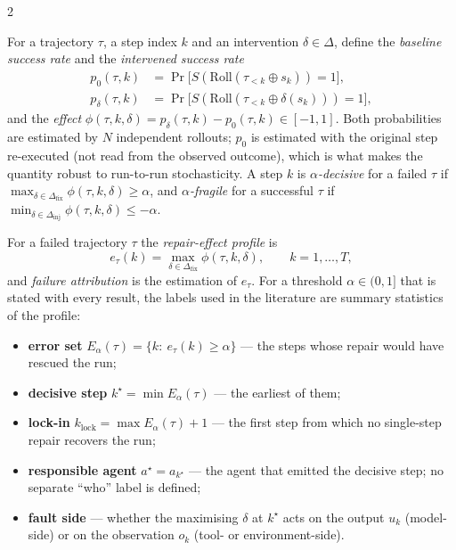 \begin{multicols}{2}
\begin{definition}\label{def:effect}
For a trajectory $\tau$, a step index $k$ and an intervention $\delta\in\Delta$, define the \emph{baseline success rate} and the \emph{intervened success rate}
\begin{align*}
p_0(\tau,k)&=\Pr\big[S(\mathrm{Roll}(\tau_{<k}\oplus s_k))=1\big],\\
p_\delta(\tau,k)&=\Pr\big[S(\mathrm{Roll}(\tau_{<k}\oplus\delta(s_k)))=1\big],
\end{align*}
and the \emph{effect} $\phi(\tau,k,\delta)=p_\delta(\tau,k)-p_0(\tau,k)\in[-1,1]$. Both probabilities are estimated by $N$ independent rollouts; $p_0$ is estimated with the original step re-executed (not read from the observed outcome), which is what makes the quantity robust to run-to-run stochasticity. A step $k$ is \emph{$\alpha$-decisive} for a failed $\tau$ if $\max_{\delta\in\Delta_{\mathrm{fix}}}\phi(\tau,k,\delta)\ge\alpha$, and \emph{$\alpha$-fragile} for a successful $\tau$ if $\min_{\delta\in\Delta_{\mathrm{inj}}}\phi(\tau,k,\delta)\le-\alpha$.
\end{definition}

\begin{definition}\label{def:fa}
For a failed trajectory $\tau$ the \emph{repair-effect profile} is
\[e_\tau(k)=\max_{\delta\in\Delta_{\mathrm{fix}}}\phi(\tau,k,\delta),\qquad k=1,\dots,T,\]
and \emph{failure attribution} is the estimation of $e_\tau$. For a threshold $\alpha\in(0,1]$ that is stated with every result, the labels used in the literature are summary statistics of the profile:
\begin{itemize}[leftmargin=1.1em]
\item \textbf{error set} $E_\alpha(\tau)=\{k:\ e_\tau(k)\ge\alpha\}$ --- the steps whose repair would have rescued the run;
\item \textbf{decisive step} $k^\star=\min E_\alpha(\tau)$ --- the earliest of them;
\item \textbf{lock-in} $k_{\mathrm{lock}}=\max E_\alpha(\tau)+1$ --- the first step from which no single-step repair recovers the run;
\item \textbf{responsible agent} $a^\star=a_{k^\star}$ --- the agent that emitted the decisive step; no separate ``who'' label is defined;
\item \textbf{fault side} --- whether the maximising $\delta$ at $k^\star$ acts on the output $u_k$ (model-side) or on the observation $o_k$ (tool- or environment-side).
\end{itemize}
\end{definition}


\end{multicols}
